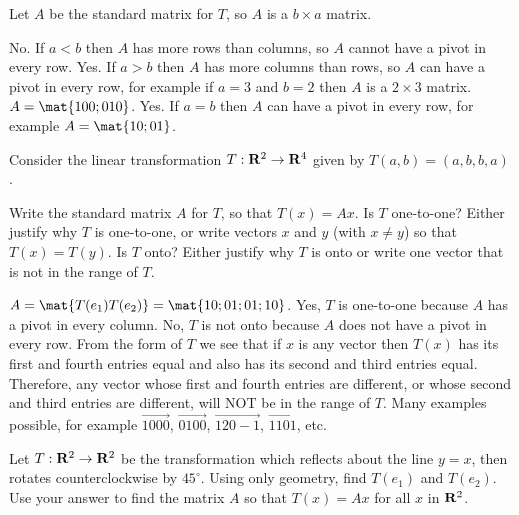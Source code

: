 \begin{problems}
\begin{solution}
  Let $A$ be the standard matrix for $T$, so $A$ is a $b \times a$
  matrix.
  \begin{subproblems}
    \subproblem No.  If $a < b$ then $A$ has more rows than columns,
    so $A$ cannot have a pivot in every row. %
    \subproblem Yes.  If $a > b$ then $A$ has more columns than rows,
    so $A$ can have a pivot in every row, for example if $a = 3$ and
    $b=2$ then $A$ is a $2 \times 3$ matrix.
    $A = \mat{1 0 0; 0 1 0}$. %
    \subproblem Yes.  If $a = b$ then $A$ can have a pivot in every
    row, for example $A = \mat{1 0; 0 1}$.
  \end{subproblems}
\end{solution}


\problem Consider the linear transformation
$T: {\bf R}^2 \to {\bf R}^4$ given by $T(a, b) = (a, b, b, a)$.
\begin{subproblems}
  \subproblem Write the standard matrix $A$ for $T$, so that
  $T(x) = Ax$. %
  \subproblem Is $T$ one-to-one?  Either justify why $T$ is
  one-to-one, or write vectors $x$ and $y$ (with $x \neq y$) so that
  $T(x) = T(y)$. %
  \subproblem Is $T$ onto?  Either justify why $T$ is onto or write one
  vector that is not in the range of $T$.
\end{subproblems}

\begin{solution}
  \begin{subproblems}
    \subproblem $A = \mat{T(e_1) T(e_2)}= \mat{1 0; 0 1; 0 1; 1 0}$. %
    \subproblem Yes, $T$ is one-to-one because $A$ has a pivot in
    every column. %
    \subproblem No, $T$ is not onto because $A$ does not have a pivot
    in every row.  From the form of $T$ we see that if $x$ is any
    vector then $T(x)$ has its first and fourth entries equal and also
    has its second and third entries equal. Therefore, any vector
    whose first and fourth entries are different, or whose second and
    third entries are different, will NOT be in the range of $T$.
    Many examples possible, for example $\vec{1 0 0 0}$,
    $\vec{0 1 0 0}$, $\vec{1 2 0 -1}$, $\vec{1 1 0 1}$, etc.
  \end{subproblems}
\end{solution}



\problem %
Let $T: {\bf R}^2 \to {\bf R}^2$ be the transformation which reflects about the
line $y = x$, then rotates counterclockwise by $45^\circ$.  Using only geometry,
find $T(e_1)$ and $T(e_2)$.  Use your answer to find the matrix $A$ so that
$T(x)=Ax$ for all $x$ in ${\bf R}^2$.


\end{problems}
